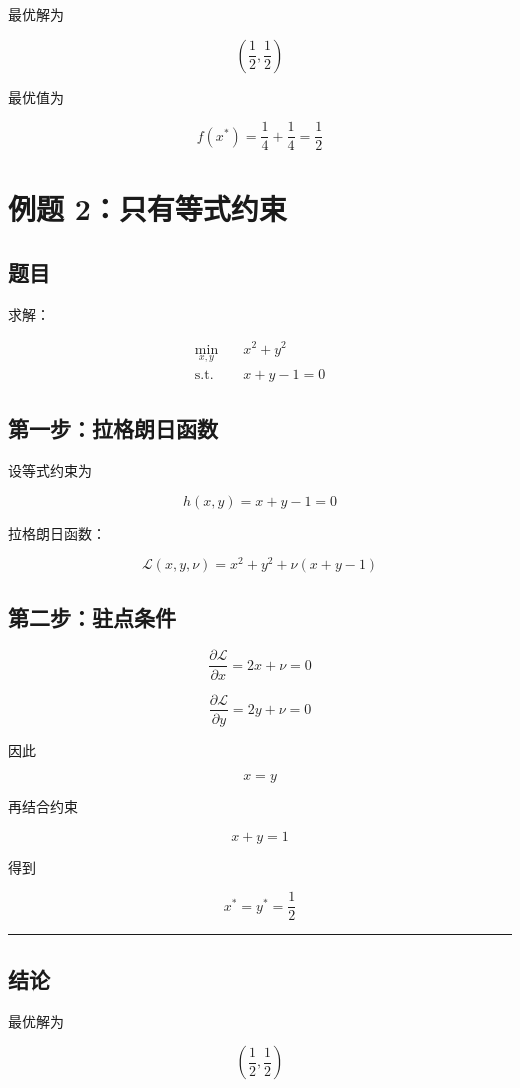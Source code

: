 最优解为

\[
\left(\frac12,\frac12\right)
\]

最优值为

\[
f(x^*)=\frac14+\frac14=\frac12
\]

\section{例题 2：只有等式约束}

\subsection{题目}

求解：

\[
\begin{aligned}
\min_{x,y}\quad & x^2+y^2\\
\text{s.t.}\quad & x+y-1=0
\end{aligned}
\]

\subsection{第一步：拉格朗日函数}

设等式约束为

\[
h(x,y)=x+y-1=0
\]

拉格朗日函数：

\[
\mathcal{L}(x,y,\nu)=x^2+y^2+\nu(x+y-1)
\]

\subsection{第二步：驻点条件}

\[
\frac{\partial \mathcal{L}}{\partial x}=2x+\nu=0
\]

\[
\frac{\partial \mathcal{L}}{\partial y}=2y+\nu=0
\]

因此

\[
x=y
\]

再结合约束

\[
x+y=1
\]

得到

\[
x^*=y^*=\frac12
\]

\hrule

\subsection{结论}

最优解为

\[
\left(\frac12,\frac12\right)
\]

